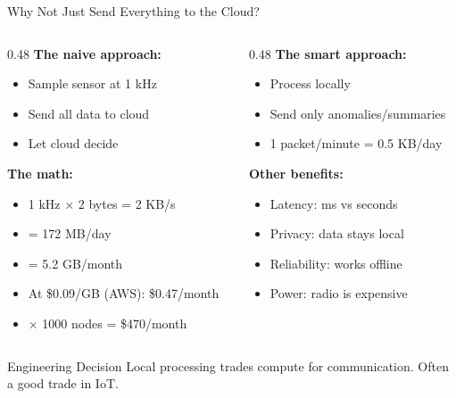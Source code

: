 \documentclass[aspectratio=169,11pt]{beamer}
\begin{document}
\begin{frame}{Why Not Just Send Everything to the Cloud?}
    \begin{columns}[T]
        \begin{column}{0.48\textwidth}
            \textbf{The naive approach:}
            \begin{itemize}
                \item Sample sensor at 1 kHz
                \item Send all data to cloud
                \item Let cloud decide
            \end{itemize}
            
            \vspace{0.3cm}
            \textbf{The math:}
            \begin{itemize}
                \item 1 kHz $\times$ 2 bytes = 2 KB/s
                \item = 172 MB/day
                \item = 5.2 GB/month
                \item At \$0.09/GB (AWS): \$0.47/month
                \item $\times$ 1000 nodes = \$470/month
            \end{itemize}
        \end{column}
        \begin{column}{0.48\textwidth}
            \textbf{The smart approach:}
            \begin{itemize}
                \item Process locally
                \item Send only anomalies/summaries
                \item 1 packet/minute = 0.5 KB/day
            \end{itemize}
            
            \vspace{0.3cm}
            \textbf{Other benefits:}
            \begin{itemize}
                \item Latency: ms vs seconds
                \item Privacy: data stays local
                \item Reliability: works offline
                \item Power: radio is expensive
            \end{itemize}
        \end{column}
    \end{columns}
    
    \vspace{0.3cm}
    \begin{alertblock}{Engineering Decision}
        Local processing trades compute for communication. Often a good trade in IoT.
    \end{alertblock}
\end{frame}
\end{document}
